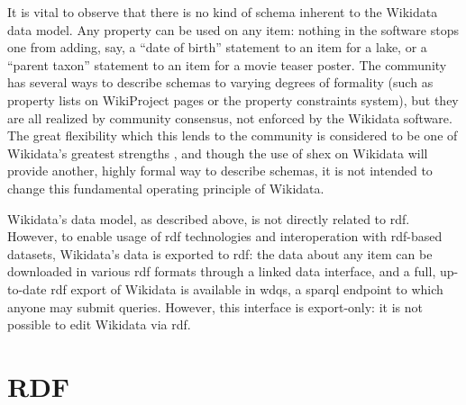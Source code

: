 It is vital to observe that there is no kind of \gls{schema} inherent to the \gls{Wikidata} data model.
Any \gls{property} can be used on any \gls{item}:
nothing in the software stops one from adding, say,
a “date of birth” \gls{statement} to an \gls{item} for a lake,
or a “parent taxon” \gls{statement} to an \gls{item} for a movie teaser poster.
The community has several ways to describe \glspl{schema} to varying degrees of formality
(such as \gls{property} lists on WikiProject pages or the property constraints system),
but they are all realized by community consensus,
not enforced by the \gls{Wikidata} software.
The great flexibility which this lends to the community
is considered to be one of \gls{Wikidata}’s greatest strengths \cite{vrandecic-restricting-the-world},
and though the use of \gls{shex}
on \gls{Wikidata} will provide another,
highly formal way to describe \glspl{schema},
it is not intended to change this fundamental operating principle of \gls{Wikidata}. %

\gls{Wikidata}’s data model, as described above,
is not directly related to \gls{rdf}.
However, to enable usage of \gls{rdf} technologies and interoperation with \gls{rdf}-based datasets,
\gls{Wikidata}’s data is exported to \gls{rdf}:
the data about any \gls{item} can be downloaded in various \gls{rdf} formats through a linked data interface, %
and a full, up-to-date \gls{rdf} export of \gls{Wikidata} is available in \gls{wdqs},
a \acrshort{sparql} endpoint to which anyone may submit queries.
However, this interface is export-only:
it is not possible to edit \gls{Wikidata} via \gls{rdf}.


\section{RDF}
\label{sec:Background:RDF}

